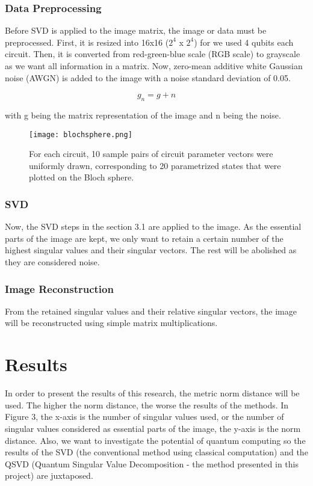 \documentclass{article}
\begin{document}
\subsubsection{Data Preprocessing}
Before SVD is applied to the image matrix, the image or data must be preprocessed. First, it is resized into 16x16 ($2^4$ x $2^4$) for we used 4 qubits each circuit. Then, it is converted from red-green-blue scale (RGB scale) to grayscale as we want all information in a matrix. Now, zero-mean additive white Gaussian noise (AWGN) is added to the image with a noise standard deviation of 0.05. 

\begin{equation} g_{n}=g + n  \end{equation} 

with g being the matrix representation of the image and n being the noise.

\begin{figure}
\centering
\texttt{[image: blochsphere.png]}
\caption{For each circuit, 10 sample pairs of circuit parameter vectors were uniformly drawn, corresponding to 20 parametrized states that were plotted on the Bloch sphere.}
\end{figure}

\subsubsection{SVD}
Now, the SVD steps in the section 3.1 are applied to the image. As the essential parts of the image are kept, we only want to retain a certain number of the highest singular values and their singular vectors. The rest will be abolished as they are considered noise. 

\subsubsection{Image Reconstruction}
From the retained singular values and their relative singular vectors, the image will be reconstructed using simple matrix multiplications.

\section{Results}
In order to present the results of this research, the metric norm distance will be used. The higher the norm distance, the worse the results of the methods. In Figure 3, the x-axis is the number of singular values used, or the number of singular values considered as essential parts of the image, the y-axis is the norm distance. Also, we want to investigate the potential of quantum computing so the results of the SVD (the conventional method using classical computation) and the QSVD (Quantum Singular Value Decomposition - the method presented in this project) are juxtaposed.
\end{document}
